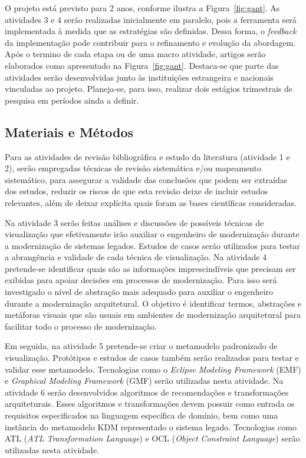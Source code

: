 \documentclass[12pt]{article}
\begin{document}
O projeto está previsto para 2 anos, conforme ilustra a Figura~\ref{fig:gant}. As atividades 3 e 4 serão realizadas inicialmente em paralelo, pois a ferramenta será implementada à medida que as estratégias são definidas. Dessa forma, o \textit{feedback} da implementação pode contribuir para o refinamento e evolução da abordagem. Após o termino de cada etapa ou de uma macro atividade, artigos serão elaborados como apresentado na Figura~\ref{fig:gant}. 
Destaca-se que parte das atividades serão desenvolvidas junto às instituições estrangeira e nacionais vinculadas ao projeto. Planeja-se, para isso, realizar dois estágios trimestrais de pesquisa em períodos ainda a definir. 

\subsection{Materiais e Métodos}

Para as atividades de revisão bibliográfica e estudo da literatura (atividade 1 e 2), serão empregadas técnicas de revisão sistemática e/ou mapeamento sistemático, para assegurar a validade das conclusões que podem ser extraídas dos estudos, reduzir os riscos de que esta revisão deixe de incluir estudos relevantes, além de deixar explícita quais foram as bases científicas consideradas.

Na atividade 3 serão feitas análises e discussões de possíveis técnicas de visualização que efetivamente irão auxiliar o engenheiro de modernização durante a modernização de sistemas legados. Estudos de casos serão utilizados para testar a abrangência e validade de cada técnica de visualização. Na atividade 4 pretende-se identificar quais são as informações imprescindíveis que precisam ser exibidas para apoiar decisões em processos de modernização. Para isso será investigado o nível de abstração mais adequado para auxiliar o engenheiro durante a modernização arquitetural. O objetivo é identificar termos, abstrações e metáforas visuais que são usuais em ambientes de modernização arquitetural para facilitar todo o processo de modernização.

Em seguida, na atividade 5 pretende-se criar o metamodelo padronizado de visualização. Protótipos e estudos de casos também serão realizados para testar e validar esse metamodelo. Tecnologias como o \textit{Eclipse Modeling Framework} (EMF) e \textit{Graphical Modeling Framework} (GMF) serão utilizadas nesta atividade. Na atividade 6 serão desenvolvidos algoritmos de recomendações e transformações arquiteturais. Esses algoritmos e transformações devem possuir como entrada os requisitos especificados na linguagem específica de domínio, bem como uma instância do metamodelo KDM representado o sistema legado. Tecnologias como ATL (\textit{ATL Transformation Language}) e OCL (\textit{Object Constraint Language}) serão utilizadas nesta atividade. 
\end{document}
